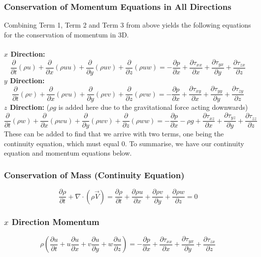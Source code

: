 \documentclass[class=report, crop=false, 12pt,a4paper]{standalone}
\begin{document}
\subsubsection{Conservation of Momentum Equations in All Directions}
Combining Term 1, Term 2 and Term 3 from above yields the following equations for the conservation of momentum in 3D. \\\\
\textbf{$x$ Direction:}
\begin{equation}
  \frac{\partial}{\partial t} (\rho u ) + \frac{\partial}{\partial x} (\rho uu) + \frac{\partial}{\partial y} (\rho uv) + \frac{\partial}{\partial z} (\rho uw) = -\frac{\partial p}{\partial x} + \frac{\partial \tau_{xx}}{\partial x} + \frac{\partial \tau_{yx}}{\partial y} + \frac{\partial \tau_{zx}}{\partial z}
\end{equation}
\textbf{$y$ Direction:}
\begin{equation}
  \frac{\partial}{\partial t} (\rho v ) + \frac{\partial}{\partial x} (\rho vu) + \frac{\partial}{\partial y} (\rho vv) + \frac{\partial}{\partial z} (\rho vw) = -\frac{\partial p}{\partial x} + \frac{\partial \tau_{xy}}{\partial x} + \frac{\partial \tau_{yy}}{\partial y} + \frac{\partial \tau_{zy}}{\partial z}
\end{equation}
\textbf{$z$ Direction:} ($\rho g$ is added here due to the gravitational force acting downwards)
\begin{equation}
  \frac{\partial}{\partial t} (\rho w ) + \frac{\partial}{\partial x} (\rho wu) + \frac{\partial}{\partial y} (\rho wv) + \frac{\partial}{\partial z} (\rho ww) = -\frac{\partial p}{\partial x} - \rho g + \frac{\partial \tau_{xz}}{\partial x} + \frac{\partial \tau_{yz}}{\partial y} + \frac{\partial \tau_{zz}}{\partial z}
\end{equation}
These can be added to find that we arrive with two terms, one being the continuity equation, which must equal 0. To summarise, we have our continuity equation and momentum equations below.
\subsubsection{Conservation of Mass (Continuity Equation)}
\begin{equation}
  \frac{\partial \rho}{\partial t} + \nabla \cdot (\rho \vec{V}) = \frac{\partial \rho}{\partial t} + \frac{\partial \rho u}{\partial x} + \frac{\partial \rho v}{\partial y} + \frac{\partial \rho w}{\partial z} = 0
\end{equation}
\subsubsection{$x$ Direction Momentum}
\begin{equation}
  \rho \left( \frac{\partial u}{\partial t} + u \frac{\partial u}{\partial x} + v \frac{\partial u}{\partial y} + w \frac{\partial u}{\partial z} \right) = -\frac{\partial p}{\partial x} + \frac{\partial \tau_{xx}}{\partial x} + \frac{\partial \tau_{yx}}{\partial y} + \frac{\partial \tau_{zx}}{\partial z}
\end{equation}
\end{document}
